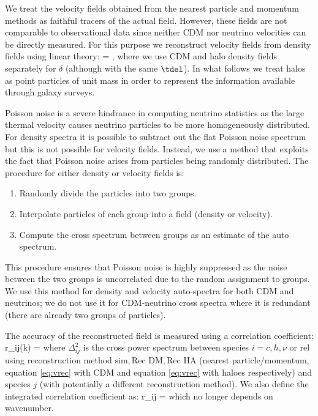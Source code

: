 We treat the velocity fields obtained from the nearest particle and momentum methods as faithful tracers of the actual field. However, these fields are not comparable to observational data since neither CDM nor neutrino velocities can be directly measured.  For this purpose we reconstruct velocity fields from density fields using linear theory:
\bq
{} = \frac{\tvel}{\tdel}\delta,
\label{eq:vrec}
\eq
where we use CDM and halo density fields separately for $\delta$ (although with the same $\tdel$).  In what follows we treat halos as point particles of unit mass in order to represent the information available through galaxy surveys.  
  
Poisson noise is a severe hindrance in computing neutrino statistics as the large thermal velocity causes neutrino particles to be more homogeneously distributed.  For density spectra it is possible to subtract out the flat Poisson noise spectrum but this is not possible for velocity fields.  Instead, we use a method that exploits the fact that Poisson noise arises from particles being randomly distributed.  The procedure for either density or velocity fields is:
\begin{enumerate}
\item Randomly divide the particles into two groups.
\item Interpolate particles of each group into a field (density or velocity).
\item Compute the cross spectrum between groups as an estimate of the auto spectrum.
\end{enumerate}
This procedure ensures that Poisson noise is highly suppressed as the noise between the two groups is uncorrelated due to the random assignment to groups.  We use this method for density and velocity auto-spectra for both CDM and neutrinos; we do not use it for CDM-neutrino cross spectra where it is redundant (there are already two groups of particles).  
  
The accuracy of the reconstructed field is measured using a correlation coefficient:
\bq
r_{ij}(k) =  {  }
\label{eq:rij} 
\eq
where $\Delta^2_{ij}$ is the cross power spectrum between species $i=c,h,\nu \textrm{ or rel}$ using reconstruction method $\mbox{sim}, \mbox{Rec DM}, \mbox{Rec HA}$ (nearest particle/momentum, equation \ref{eq:vrec} with CDM and equation \ref{eq:vrec} with haloes respectively) and species $j$ (with potentially a different reconstruction method).  We also define the integrated correlation coefficient as:
\bq
r_{ij} = 
\label{eq:intrij}
\eq
which no longer depends on wavenumber.
  
